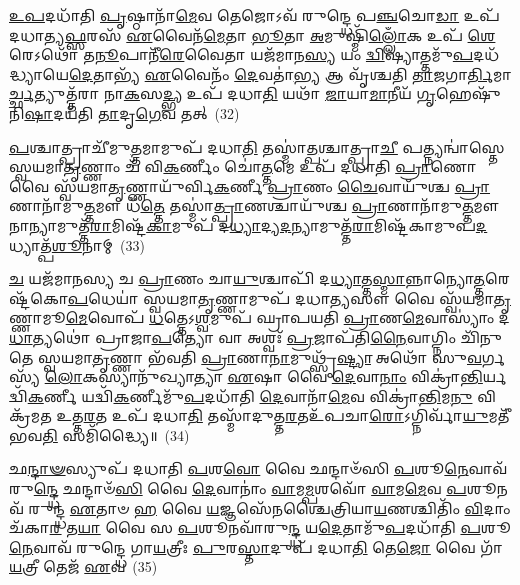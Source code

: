 \-\ul{𑌉}\-\-\ul{𑌪}\-𑌦𑌧𑌾᳴𑌤𑌿 \ul{𑌪𑍃}\-𑌷𑍍𑌠𑌾𑌨𑌾᳴\-\ul{𑌮𑍇}\-𑌵 𑌤𑍇𑌜𑍋\-𑌽𑌵᳴ 𑌰𑍁𑌨𑍍𑌦𑍍𑌧𑍇 𑌪\-\ul{𑌞𑍍𑌚}\-𑌚𑍋\-\ul{𑌡𑌾} 𑌉𑌪᳴ 𑌦𑌧𑌾𑌤𑍍𑌯\-\ul{𑌫𑍍𑌸}\-𑌰𑌸᳴ \ul{𑌏}\-𑌵𑍈𑌨᳴\-\ul{𑌮𑍇}\-𑌤𑌾 \ul{𑌭𑍂}\-𑌤𑌾 \ul{𑌅}\-𑌮𑍁𑌷𑍍𑌮𑌿᳴\-\ul{𑌲𑍍𑌲𑍋𑌁}\-𑌕 𑌉𑌪᳴ \ul{𑌶𑍇}\-𑌰𑍇\-𑌽𑌥𑍋᳴ 𑌤\-\ul{𑌨𑍂}\-𑌪𑌾𑌨𑍀᳴\-\ul{𑌰𑍇}\-𑌵𑍈𑌤𑌾 𑌯𑌜᳴𑌮𑌾𑌨\-\ul{𑌸𑍍𑌯} 𑌯𑌂 \ul{𑌦𑍍𑌵𑌿}\-𑌷𑍍𑌯𑌾𑌤𑍍𑌤𑌮𑍁᳴\-\ul{𑌪}\-𑌦𑌧᳴𑌦𑍍𑌧𑍍𑌯𑌾𑌯𑍇\-\ul{𑌦𑍇}\-𑌤𑌾𑌭𑍍𑌯᳴ \ul{𑌏}\-𑌵𑍈𑌨𑌂᳴ \ul{𑌦𑍇}\-𑌵𑌤𑌾॑\-\ul{𑌭𑍍𑌯} 𑌆 𑌵𑍃᳴𑌶𑍍𑌚𑌤𑌿 \ul{𑌤𑌾}\-𑌜𑌗𑌾\-\ul{𑌰𑍍𑌤𑌿}\-𑌮𑌾\-\ul{𑌰𑍍𑌚𑍍𑌛}\-𑌤𑍍𑌯𑍁𑌤𑍍𑌤᳴𑌰𑌾 𑌨𑌾\-\ul{𑌕}\-𑌸\-\ul{𑌦𑍍𑌭𑍍𑌯} 𑌉𑌪᳴ 𑌦𑌧𑌾\-\ul{𑌤𑌿} 𑌯𑌥𑌾᳴ \ul{𑌜𑌾}\-𑌯𑌾\-\ul{𑌮𑌾}\-𑌨𑍀𑌯᳴ \ul{𑌗𑍃}\-𑌹𑍇𑌷𑍁᳴ 𑌨𑌿\-\ul{𑌷𑌾}\-𑌦𑌯᳴𑌤𑌿 \ul{𑌤𑌾}\-𑌦𑍃\-\ul{𑌗𑍇}\-𑌵 𑌤𑌤𑍍~(32)

\-\ul{𑌪}\-𑌶𑍍𑌚𑌾𑌤𑍍𑌪𑍍𑌰𑌾𑌚𑍀᳴𑌮𑍁\-\ul{𑌤𑍍𑌤}\-𑌮𑌾𑌮𑍁𑌪᳴ 𑌦𑌧𑌾\-\ul{𑌤𑌿} 𑌤𑌸𑍍𑌮𑌾॑\-\ul{𑌤𑍍𑌪}\-𑌶𑍍𑌚𑌾𑌤𑍍𑌪𑍍𑌰𑌾\-\ul{𑌚𑍀} 𑌪𑌤𑍍𑌨𑍍𑌯𑌨𑍍𑌵𑌾॑𑌸𑍍𑌤𑍇 𑌸𑍍𑌵𑌯𑌮𑌾\-\ul{𑌤𑍃}\-𑌣𑍍𑌣𑌾𑌂 𑌚᳴ 𑌵𑌿\-\ul{𑌕}\-𑌰𑍍𑌣𑍀𑌂 𑌚𑍋॑\-\ul{𑌤𑍍𑌤}\-𑌮𑍇 𑌉𑌪᳴ 𑌦𑌧𑌾𑌤𑌿 \ul{𑌪𑍍𑌰𑌾}\-𑌣𑍋 𑌵𑍈 𑌸𑍍𑌵᳴𑌯𑌮𑌾\-\ul{𑌤𑍃}\-𑌣𑍍𑌣𑌾𑌯𑍁᳴𑌰𑍍𑌵𑌿\-\ul{𑌕}\-𑌰𑍍𑌣𑍀 \ul{𑌪𑍍𑌰𑌾}\-𑌣𑌂 \ul{𑌚𑍈}\-𑌵𑌾𑌯𑍁᳴𑌶𑍍𑌚 \ul{𑌪𑍍𑌰𑌾}\-𑌣𑌾𑌨𑌾᳴𑌮𑍁\-\ul{𑌤𑍍𑌤}\-𑌮𑍗 𑌧᳴\-\ul{𑌤𑍍𑌤𑍇} 𑌤𑌸𑍍𑌮𑌾॑\-\ul{𑌤𑍍𑌪𑍍𑌰𑌾}\-𑌣𑌶𑍍𑌚𑌾𑌯𑍁᳴𑌶𑍍𑌚 \ul{𑌪𑍍𑌰𑌾}\-𑌣𑌾𑌨𑌾᳴𑌮𑍁\-\ul{𑌤𑍍𑌤}\-𑌮𑍗 𑌨𑌾𑌨𑍍𑌯𑌾𑌮𑍁𑌤𑍍𑌤᳴\-\ul{𑌰𑌾}\-𑌮𑌿𑌷𑍍𑌟᳴\-\ul{𑌕𑌾}\-𑌮𑍁𑌪᳴ 𑌦\-\ul{𑌧𑍍𑌯𑌾}\-𑌦𑍍𑌯\-\ul{𑌦}\-𑌨𑍍𑌯𑌾𑌮𑍁𑌤𑍍𑌤᳴\-\ul{𑌰𑌾}\-𑌮𑌿𑌷𑍍𑌟᳴𑌕𑌾𑌮𑍁𑌪\-\ul{𑌦}\-𑌧𑍍𑌯𑌾𑌤𑍍𑌪᳴\-\ul{𑌶𑍂}\-𑌨𑌾𑌮𑍍~(33)

\-\ul{𑌚} 𑌯𑌜᳴𑌮𑌾𑌨𑌸𑍍𑌯 𑌚 \ul{𑌪𑍍𑌰𑌾}\-𑌣𑌂 𑌚𑌾\-\ul{𑌯𑍁}\-𑌶𑍍𑌚𑌾𑌪𑌿᳴ 𑌦\-\ul{𑌧𑍍𑌯𑌾}\-𑌤𑍍𑌤\-\ul{𑌸𑍍𑌮𑌾}\-𑌨𑍍𑌨𑌾𑌨𑍍𑌯𑍋\-\ul{𑌤𑍍𑌤}\-𑌰𑍇𑌷𑍍𑌟᳴𑌕𑍋\-\ul{𑌪}\-𑌧𑍇𑌯𑌾॑ 𑌸𑍍𑌵𑌯𑌮𑌾\-\ul{𑌤𑍃}\-𑌣𑍍𑌣𑌾𑌮𑍁𑌪᳴ 𑌦𑌧𑌾\-\ul{𑌤𑍍𑌯}\-𑌸𑍗 𑌵𑍈 𑌸𑍍𑌵᳴𑌯𑌮𑌾\-\ul{𑌤𑍃}\-𑌣𑍍𑌣𑌾𑌮𑍂\-\ul{𑌮𑍇}\-𑌵𑍋𑌪᳴ \ul{𑌧}\-𑌤𑍍𑌤𑍇\-𑌽\-\ul{𑌶𑍍𑌵}\-𑌮𑍁𑌪᳴ 𑌘𑍍𑌰𑌾𑌪𑌯𑌤𑌿 \ul{𑌪𑍍𑌰𑌾}\-𑌣\-\ul{𑌮𑍇}\-𑌵𑌾𑌸𑍍𑌯𑌾𑌂॑ 𑌦\-\ul{𑌧𑌾}\-𑌤𑍍𑌯𑌥𑍋॑ 𑌪𑍍𑌰𑌾𑌜𑌾\-\ul{𑌪}\-𑌤𑍍𑌯𑍋 𑌵𑌾 𑌅𑌶𑍍𑌵𑌃᳴ \ul{𑌪𑍍𑌰}\-𑌜𑌾𑌪᳴𑌤𑌿\-\ul{𑌨𑍈}\-𑌵𑌾𑌗𑍍𑌨𑌿𑌂 𑌚𑌿᳴𑌨𑍁𑌤𑍇 𑌸𑍍𑌵𑌯𑌮𑌾\-\ul{𑌤𑍃}\-𑌣𑍍𑌣𑌾 𑌭᳴𑌵𑌤𑌿 \ul{𑌪𑍍𑌰𑌾}\-𑌣𑌾\-\ul{𑌨𑌾}\-𑌮𑍁𑌥𑍍𑌸𑍃᳴\-\ul{𑌷𑍍𑌟𑍍𑌯𑌾} 𑌅𑌥𑍋᳴ 𑌸𑍁\-\ul{𑌵}\-𑌰𑍍𑌗𑌸𑍍𑌯᳴ \ul{𑌲𑍋}\-𑌕𑌸𑍍𑌯𑌾𑌨𑍁᳴𑌖𑍍𑌯𑌾𑌤𑍍𑌯𑌾 \ul{𑌏}\-𑌷𑌾 𑌵𑍈 \ul{𑌦𑍇}\-𑌵𑌾\-\ul{𑌨𑌾𑌂} 𑌵𑌿𑌕𑍍𑌰𑌾॑\-\ul{𑌨𑍍𑌤𑌿}\-𑌰𑍍𑌯𑌦𑍍𑌵𑌿᳴\-\ul{𑌕}\-𑌰𑍍𑌣𑍀 𑌯𑌦𑍍𑌵𑌿᳴\-\ul{𑌕}\-𑌰𑍍𑌣𑍀𑌮𑍁᳴\-\ul{𑌪}\-𑌦𑌧𑌾᳴𑌤𑌿 \ul{𑌦𑍇}\-𑌵𑌾𑌨𑌾᳴\-\ul{𑌮𑍇}\-𑌵 𑌵𑌿𑌕𑍍𑌰𑌾॑\-\ul{𑌨𑍍𑌤𑌿}\-𑌮\-\ul{𑌨𑍁} 𑌵𑌿 𑌕𑍍𑌰᳴𑌮𑌤 𑌉𑌤𑍍𑌤\-\ul{𑌰}\-𑌤 𑌉𑌪᳴ 𑌦𑌧𑌾\-\ul{𑌤𑌿} 𑌤𑌸𑍍𑌮𑌾᳴𑌦𑍁𑌤𑍍𑌤\-\ul{𑌰}\-𑌤𑌉᳴𑌪𑌚𑌾\-\ul{𑌰𑍋}\-\-𑌽𑌗𑍍𑌨𑌿𑌰𑍍𑌵𑌾᳴\-\ul{𑌯𑍁}\-𑌮𑌤𑍀᳴ 𑌭𑌵\-\ul{𑌤𑌿} 𑌸𑌮𑌿᳴𑌦𑍍𑌧𑍍𑌯𑍈॥~(34)

{\anuvakamend[{𑌸𑌮𑍍𑌭𑍃᳴\-\ul{𑌤𑌂} 𑌯𑌨𑍍𑌨𑌾᳴\-\ul{𑌕}\-𑌸\-\ul{𑌦𑍋} 𑌯𑌨𑍍𑌨𑌾᳴\-\ul{𑌕}\-𑌸\-\ul{𑌦}\-𑌸𑍍𑌤𑌤𑍍𑌪᳴\-\ul{𑌶𑍂}\-𑌨𑌾\-\ul{𑌮𑍇}\-𑌷𑌾𑌂 𑌵𑍈 𑌦𑍍𑌵𑌾𑌵𑌿𑍞᳴𑌶𑌤𑌿𑌶𑍍𑌚}]}%

𑌛\-\ul{𑌨𑍍𑌦𑌾}\-\-\ul{𑍟}\-𑌸𑍍𑌯𑍁𑌪᳴ 𑌦𑌧𑌾𑌤𑌿 \ul{𑌪}\-𑌶\-\ul{𑌵𑍋} 𑌵𑍈 𑌛𑌨𑍍𑌦𑌾𑍞᳴𑌸𑌿 \ul{𑌪}\-𑌶𑍂\-\ul{𑌨𑍇}\-𑌵𑌾𑌵᳴ 𑌰𑍁\-\ul{𑌨𑍍𑌦𑍍𑌧𑍇} 𑌛𑌨𑍍𑌦𑌾𑍞᳴\-\ul{𑌸𑌿} 𑌵𑍈 \ul{𑌦𑍇}\-𑌵𑌾𑌨𑌾𑌂॑ \ul{𑌵𑌾}\-𑌮\-\ul{𑌮𑍍𑌪}\-𑌶𑌵𑍋᳴ \ul{𑌵𑌾}\-𑌮\-\ul{𑌮𑍇}\-𑌵 \ul{𑌪}\-𑌶𑍂𑌨𑌵᳴ 𑌰𑍁𑌨𑍍𑌦𑍍𑌧 \ul{𑌏}\-𑌤𑌾𑍞 \ul{𑌹} 𑌵𑍈 \ul{𑌯}\-𑌜𑍍𑌞𑌸𑍇᳴𑌨𑌶𑍍𑌚𑍈𑌤𑍍𑌰𑌿𑌯𑌾\-\ul{𑌯}\-𑌣𑌶𑍍𑌚𑌿𑌤𑌿𑌂᳴ \ul{𑌵𑌿}\-𑌦𑌾𑌂 𑌚᳴𑌕𑌾\-\ul{𑌰} 𑌤\-\ul{𑌯𑌾} 𑌵𑍈 𑌸 \ul{𑌪}\-𑌶𑍂𑌨𑌵𑌾᳴𑌰𑍁\-\ul{𑌨𑍍𑌦𑍍𑌧} 𑌯\-\ul{𑌦𑍇}\-𑌤𑌾𑌮𑍁᳴\-\ul{𑌪}\-𑌦𑌧𑌾᳴𑌤𑌿 \ul{𑌪}\-𑌶𑍂\-\ul{𑌨𑍇}\-𑌵𑌾𑌵᳴ 𑌰𑍁𑌨𑍍𑌦𑍍𑌧𑍇 𑌗𑌾\-\ul{𑌯}\-𑌤𑍍𑌰𑍀𑌃 \ul{𑌪𑍁}\-𑌰\-\ul{𑌸𑍍𑌤𑌾}\-𑌦𑍁𑌪᳴ 𑌦𑌧𑌾\-\ul{𑌤𑌿} 𑌤𑍇\-\ul{𑌜𑍋} 𑌵𑍈 𑌗𑌾᳴\-\ul{𑌯}\-𑌤𑍍𑌰𑍀 𑌤𑍇𑌜᳴ \ul{𑌏}\-𑌵~(35)

